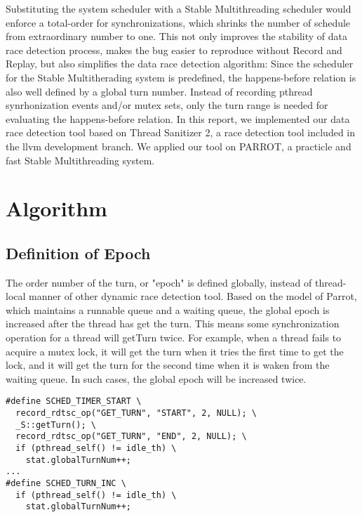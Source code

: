 Substituting the system scheduler with a Stable Multithreading scheduler would enforce a total-order for synchronizations, which
shrinks the number of schedule from extraordinary number to one. This not only improves the stability of data race detection process,
makes the bug easier to reproduce without Record and Replay, but also simplifies the data race detection algorithm: Since the scheduler for
the Stable Multitherading system is predefined, the happens-before relation is also well defined by a global turn number.
Instead of recording pthread synrhonization events and/or mutex sets, only the turn range is needed for evaluating the happens-before relation.
In this report, we implemented our data race detection tool based on Thread Sanitizer 2, a race detection tool included in the llvm development branch.
We applied our tool on PARROT, a practicle and fast Stable Multithreading system.

\section{Algorithm}
\subsection{Definition of Epoch}

The order number of the turn, or "epoch" is defined globally, instead of thread-local manner of other dynamic race detection tool. 
Based on the model of Parrot, which maintains a runnable queue and a waiting queue, 
the global epoch is increased after the thread has get the turn. This means some synchronization operation for a thread will getTurn twice. 
For example, when a thread fails to acquire a mutex lock, it will get the turn when it tries the first time to get the lock, 
and it will get the turn for the second time when it is waken from the waiting queue. In such cases, the global epoch will be increased twice.

\lstset{language=C++,captionpos=b}
 \begin{lstlisting}[caption=Additional codes in PARROT runtime]
#define SCHED_TIMER_START \
  record_rdtsc_op("GET_TURN", "START", 2, NULL); \
  _S::getTurn(); \
  record_rdtsc_op("GET_TURN", "END", 2, NULL); \
  if (pthread_self() != idle_th) \
    stat.globalTurnNum++; 
...
#define SCHED_TURN_INC \
  if (pthread_self() != idle_th) \
    stat.globalTurnNum++; 
 \end{lstlisting}

